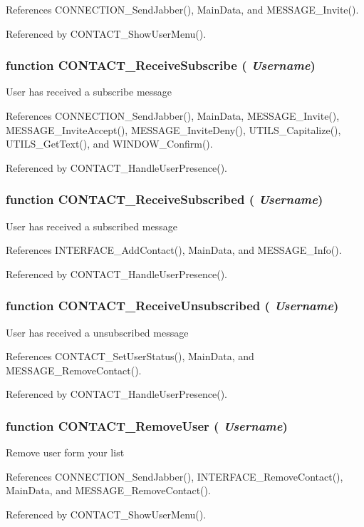 References CONNECTION\_\-SendJabber(), MainData, and MESSAGE\_\-Invite().

Referenced by CONTACT\_\-ShowUserMenu().
\subsubsection{\setlength{\rightskip}{0pt plus 5cm}function CONTACT\_\-ReceiveSubscribe ( {\em Username})}\label{invite_8js_4faf39656bf14608ddb5a9be8c9f4918}


User has received a subscribe message 

References CONNECTION\_\-SendJabber(), MainData, MESSAGE\_\-Invite(), MESSAGE\_\-InviteAccept(), MESSAGE\_\-InviteDeny(), UTILS\_\-Capitalize(), UTILS\_\-GetText(), and WINDOW\_\-Confirm().

Referenced by CONTACT\_\-HandleUserPresence().
\subsubsection{\setlength{\rightskip}{0pt plus 5cm}function CONTACT\_\-ReceiveSubscribed ( {\em Username})}\label{invite_8js_ecd90dc0768cd5cb226d362239963a56}


User has received a subscribed message 

References INTERFACE\_\-AddContact(), MainData, and MESSAGE\_\-Info().

Referenced by CONTACT\_\-HandleUserPresence().
\subsubsection{\setlength{\rightskip}{0pt plus 5cm}function CONTACT\_\-ReceiveUnsubscribed ( {\em Username})}\label{invite_8js_aa0fa0af2b65fc5353c7d385a0ba0907}


User has received a unsubscribed message 

References CONTACT\_\-SetUserStatus(), MainData, and MESSAGE\_\-RemoveContact().

Referenced by CONTACT\_\-HandleUserPresence().
\subsubsection{\setlength{\rightskip}{0pt plus 5cm}function CONTACT\_\-RemoveUser ( {\em Username})}\label{invite_8js_a6e9a955731970ad128a5a766060d73a}


Remove user form your list 

References CONNECTION\_\-SendJabber(), INTERFACE\_\-RemoveContact(), MainData, and MESSAGE\_\-RemoveContact().

Referenced by CONTACT\_\-ShowUserMenu().